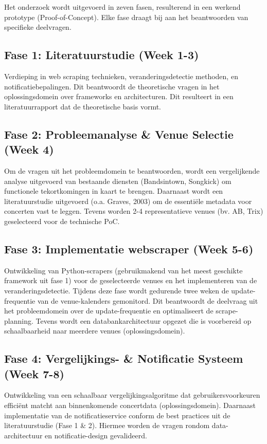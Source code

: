 Het onderzoek wordt uitgevoerd in zeven fasen, resulterend in een werkend prototype (Proof-of-Concept). Elke fase draagt bij aan het beantwoorden van specifieke deelvragen.

\subsection{Fase 1: Literatuurstudie (Week 1-3)}
Verdieping in web scraping technieken, veranderingsdetectie methoden, en notificatiebepalingen. Dit beantwoordt de theoretische vragen in het oplossingsdomein over frameworks en architecturen. Dit resulteert in een literatuurrapport dat de theoretische basis vormt.

\subsection{Fase 2: Probleemanalyse \& Venue Selectie (Week 4)}
Om de vragen uit het probleemdomein te beantwoorden, wordt een vergelijkende analyse uitgevoerd van bestaande diensten (Bandsintown, Songkick) om functionele tekortkomingen in kaart te brengen. Daarnaast wordt een literatuurstudie uitgevoerd (o.a. Graves, 2003) om de essentiële metadata voor concerten vast te leggen. Tevens worden 2-4 representatieve venues (bv. AB, Trix) geselecteerd voor de technische PoC.

\subsection{Fase 3: Implementatie webscraper (Week 5-6)}
Ontwikkeling van Python-scrapers (gebruikmakend van het meest geschikte framework uit fase 1) voor de geselecteerde venues en het implementeren van de veranderingsdetectie. Tijdens deze fase wordt gedurende twee weken de update-frequentie van de venue-kalenders gemonitord. Dit beantwoordt de deelvraag uit het probleemdomein over de update-frequentie en optimaliseert de scrape-planning. Tevens wordt een databankarchitectuur opgezet die is voorbereid op schaalbaarheid naar meerdere venues (oplossingsdomein).

\subsection{Fase 4: Vergelijkings- \& Notificatie Systeem (Week 7-8)}
Ontwikkeling van een schaalbaar vergelijkingsalgoritme dat gebruikersvoorkeuren efficiënt matcht aan binnenkomende concertdata (oplossingsdomein). Daarnaast implementatie van de notificatieservice conform de best practices uit de literatuurstudie (Fase 1 \& 2). Hiermee worden de vragen rondom data-architectuur en notificatie-design gevalideerd.


